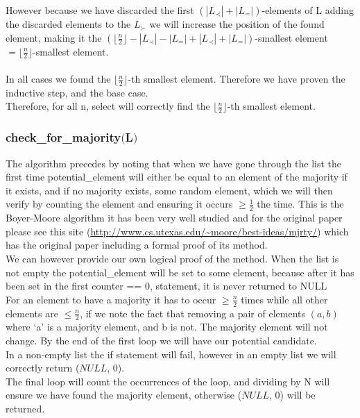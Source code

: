 \documentclass{article}
\begin{document}
        However because we have discarded the first $(|L_{\prec}| + |L_{=}|)$-elements of L adding the discarded elements to the $L_{\succ}$ we will increase the position of the found element, making it the $(\lfloor \frac{n}{2} \rfloor - |L_{\prec}| - |L_{=}| + |L_{\prec}| + |L_{=}|)$-smallest element $= \lfloor \frac{n}{2} \rfloor$-smallest element. \\
        \\
        In all cases we found the $\lfloor \frac{n}{2} \rfloor$-th smallest element. Therefore we have proven the inductive step, and the base case. \\
        Therefore, for all n, select will correctly find the $\lfloor \frac{n}{2} \rfloor$-th smallest element.
        \subsubsection{check\_for\_majority$($L$)$}
        The algorithm precedes by noting that when we have gone through the list the first time potential\_element will either be equal to an element of the majority if it exists, and if no majority exists, some random element, which we will then verify by counting the element and ensuring it occurs $\geq \frac{1}{2}$ the time. This is the Boyer-Moore algorithm it has been very well studied and for the original paper please see this site (\url{http://www.cs.utexas.edu/~moore/best-ideas/mjrty/}) which has the original paper including a formal proof of its method.\\
We can however provide our own logical proof of the method.
When the list is not empty the potential\_element will be set to some element, because after it has been set in the first counter == 0, statement, it is never returned to NULL \\
        For an element to have a majority it has to occur $\geq \frac{n}{2}$ times while all other elements are $\leq \frac{n}{2}$, if we note the fact that removing a pair of elements $(a, b)$ where `a' is a majority element, and b is not. The majority element will not change. By the end of the first loop we will have our potential candidate. \\
        In a non-empty list the if statement will fail, however in an empty list we will correctly return ($NULL$, 0). \\
        The final loop will count the occurrences of the loop, and dividing by N will ensure we have found the majority element, otherwise ($NULL$, 0) will be returned. \\
\end{document}
